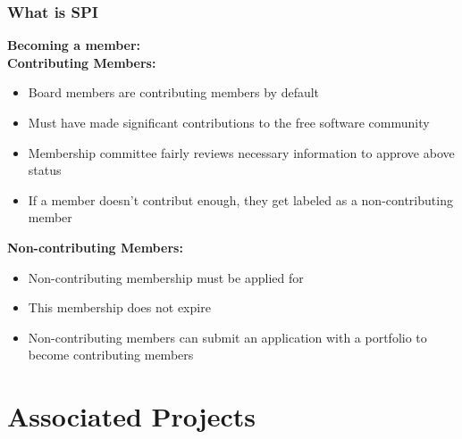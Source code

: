 \documentclass[10pt, compress]{beamer}
\begin{document}
\begin{frame}[fragile]
  \frametitle{What is SPI}
    \textbf{Becoming a member:}
    \\ \vspace{4mm}
    \textbf{Contributing Members:}
    \\
    \begin{itemize}
    \item Board members are contributing members by default
    \item Must have made significant contributions to the free software community
    \item Membership committee fairly reviews necessary information to approve above status
    \item If a member doesn't contribut enough, they get labeled as a non-contributing member
    \end{itemize}
    \textbf{Non-contributing Members:}
    \\
    \begin{itemize}
    \item Non-contributing membership must be applied for
    \item This membership does not expire
    \item Non-contributing members can submit an application with a portfolio to become contributing members
    \end{itemize}

\end{frame}


\section{Associated Projects}
\end{document}
